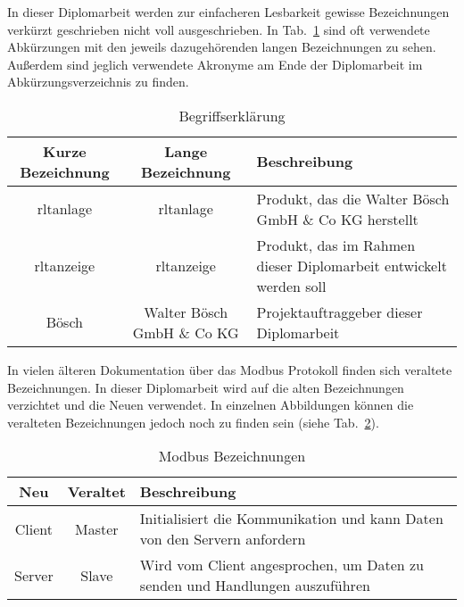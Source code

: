  \label{begriffserklaerung}

\noindent In dieser Diplomarbeit werden zur einfacheren Lesbarkeit gewisse Bezeichnungen verkürzt geschrieben \bzw nicht voll ausgeschrieben. In Tab.~\ref{tab:begriffserklaerung} sind oft verwendete Abkürzungen mit den jeweils dazugehörenden langen Bezeichnungen zu sehen. Außerdem sind jeglich verwendete Akronyme am Ende der Diplomarbeit im Abkürzungsverzeichnis zu finden. 
\begin{table}[h]
	\caption{Begriffserklärung \label{tab:begriffserklaerung}}
	\begin{tabularx}{\textwidth}{@{}c|c|X@{}}
		\toprule
		\textbf{Kurze Bezeichnung} & \textbf{Lange Bezeichnung} & \textbf{Beschreibung} \\
		\midrule
        \acs{rltanlage} & \Acl{rltanlage} &  Produkt, das die Walter Bösch GmbH \& Co KG herstellt \\
		\acs{rltanzeige} & \acl{rltanzeige} &  Produkt, das im Rahmen dieser Diplomarbeit entwickelt werden soll \\
		Bösch & Walter Bösch GmbH \& Co KG & Projektauftraggeber dieser Diplomarbeit \\
		\bottomrule
	\end{tabularx}
\end{table}


In vielen älteren Dokumentation über das Modbus Protokoll finden sich veraltete Bezeichnungen. In dieser Diplomarbeit wird auf die alten Bezeichnungen verzichtet und die Neuen verwendet. In einzelnen Abbildungen können die veralteten Bezeichnungen jedoch noch zu finden sein (siehe Tab.~\ref{tab:modbus_bezeichnung}). 
\begin{table}[h]
	\caption{Modbus Bezeichnungen \label{tab:modbus_bezeichnung}}
	\begin{tabularx}{\textwidth}{@{}c|c|X@{}}
		\toprule
		\textbf{Neu} & \textbf{Veraltet} & \textbf{Beschreibung} \\
		\midrule
		Client & Master & Initialisiert die Kommunikation und kann Daten von den Servern anfordern \\
		Server & Slave & Wird vom Client angesprochen, um Daten zu senden und Handlungen auszuführen \\
		\bottomrule
	\end{tabularx}
\end{table}


